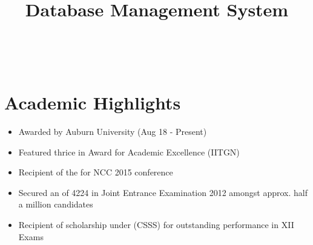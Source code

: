 \documentclass[mm]{simple_style}
\begin{document}
\begin{resume}
\iffalse
\begin{project}
\title{Hand-Written Digit Recognition using PCA}
\supervisor{Supervisor : Babji Srinivasan}
\duration{Nov '16}
\description{
- Implemented a simple MNIST classifier using PCA
}
\end{project} 
\vspace{-2ex}
\fi

\begin{project}
\title{Database Management System}
\end{project}
\\[-1.6ex]
\sectionline

\vspace{-1ex}
\section{Academic Highlights}
\begin{itemize}[label={}, leftmargin=0pt, topsep=0pt]
\item Awarded  by Auburn University (Aug 18 - Present)
\iffalse
\item Recipient of Merit-cum-Means scholarship award for meritorious performance throughout the undergraduate program
\fi
\item Featured thrice in  Award for Academic Excellence (IITGN)
\item Recipient of the  for NCC 2015 conference
\item Secured an  of 4224 in Joint Entrance Examination 2012 amongst approx. half a million candidates
\item Recipient of scholarship under  (CSSS) for outstanding performance in XII Exams
\end{itemize}
\vspace{-2ex}
\sectionline


\end{resume}
\end{document}
